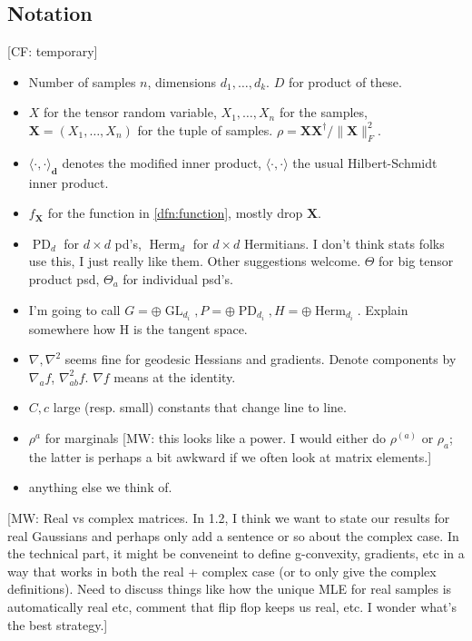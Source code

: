 \documentclass{article}
\renewcommand{\vec}{\bm}
\newcommand\PD{\operatorname{PD}}
\newcommand\Herm{\operatorname{Herm}}
\newcommand\GL{\operatorname{GL}}
\newcommand{\CF}[1]{{\color{purple}[CF: #1]}}
\newcommand{\MW}[1]{{\color{red}[MW: #1]}}
\begin{document}
\subsection{Notation}
\CF{temporary}
\begin{itemize}
\item Number of samples $n$, dimensions $d_1, \dots, d_k$. $D$ for product of these. 
\item $X$ for the tensor random variable, $X_1, \dots, X_n$ for the samples, $\vec X = (X_1, \dots, X_n)$ for the tuple of samples. $\rho = \vec X \vec X^\dagger/\|\vec X\|_F^2$.
\item $\langle \cdot, \cdot \rangle_{\vec d}$ denotes the modified inner product, $\langle \cdot, \cdot \rangle$ the usual Hilbert-Schmidt inner product. 
\item $f_{\vec X}$ for the function in \cref{dfn:function}, mostly drop $\vec X$.
\item $\PD_d$ for $d \times d$ pd's, $\Herm_d$ for $d \times d$ Hermitians. I don't think stats folks use this, I just really like them. Other suggestions welcome. $\Theta$ for big tensor product psd, $\Theta_a$ for individual psd's.
\item I'm going to call $G = \oplus \GL_{d_i}, P = \oplus \PD_{d_i}, H = \oplus \Herm_{d_i}$. Explain somewhere how H is the tangent space.
\item $\nabla, \nabla^2$ seems fine for geodesic Hessians and gradients. Denote components by $\nabla_a f$, $\nabla^2_{ab} f$. $\nabla f$ means at the identity.
\item $C, c$ large (resp. small) constants that change line to line. 
\item $\rho^a$ for marginals \MW{this looks like a power. I would either do $\rho^{(a)}$ or $\rho_a$; the latter is perhaps a bit awkward if we often look at matrix elements.}
\item anything else we think of.
\end{itemize}

\MW{Real vs complex matrices. In 1.2, I think we want to state our results for real Gaussians and perhaps only add a sentence or so about the complex case. In the technical part, it might be conveneint to define g-convexity, gradients, etc in a way that works in both the real + complex case (or to only give the complex definitions). Need to discuss things like how the unique MLE for real samples is automatically real etc, comment that flip flop keeps us real, etc. I wonder what's the best strategy.}
\end{document}
